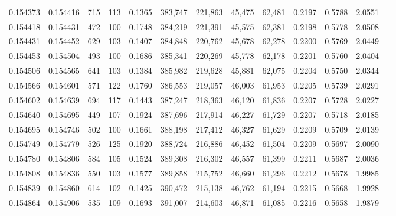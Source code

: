\begin{tabular}{rrrrrrrrrrrrr}
0.154373 & 0.154416 &   715 & 113 &                                     0.1365 & 383,747 & 221,863 &  45,475 &  62,481 & 0.2197 & 0.5788 & 2.0551 \\
0.154418 & 0.154431 &   472 & 100 &                                     0.1748 & 384,219 & 221,391 &  45,575 &  62,381 & 0.2198 & 0.5778 & 2.0508 \\
0.154431 & 0.154452 &   629 & 103 &                                     0.1407 & 384,848 & 220,762 &  45,678 &  62,278 & 0.2200 & 0.5769 & 2.0449 \\
0.154453 & 0.154504 &   493 & 100 &                                     0.1686 & 385,341 & 220,269 &  45,778 &  62,178 & 0.2201 & 0.5760 & 2.0404 \\
0.154506 & 0.154565 &   641 & 103 &                                     0.1384 & 385,982 & 219,628 &  45,881 &  62,075 & 0.2204 & 0.5750 & 2.0344 \\
0.154566 & 0.154601 &   571 & 122 &                                     0.1760 & 386,553 & 219,057 &  46,003 &  61,953 & 0.2205 & 0.5739 & 2.0291 \\
0.154602 & 0.154639 &   694 & 117 &                                     0.1443 & 387,247 & 218,363 &  46,120 &  61,836 & 0.2207 & 0.5728 & 2.0227 \\
0.154640 & 0.154695 &   449 & 107 &                                     0.1924 & 387,696 & 217,914 &  46,227 &  61,729 & 0.2207 & 0.5718 & 2.0185 \\
0.154695 & 0.154746 &   502 & 100 &                                     0.1661 & 388,198 & 217,412 &  46,327 &  61,629 & 0.2209 & 0.5709 & 2.0139 \\
0.154749 & 0.154779 &   526 & 125 &                                     0.1920 & 388,724 & 216,886 &  46,452 &  61,504 & 0.2209 & 0.5697 & 2.0090 \\
0.154780 & 0.154806 &   584 & 105 &                                     0.1524 & 389,308 & 216,302 &  46,557 &  61,399 & 0.2211 & 0.5687 & 2.0036 \\
0.154808 & 0.154836 &   550 & 103 &                                     0.1577 & 389,858 & 215,752 &  46,660 &  61,296 & 0.2212 & 0.5678 & 1.9985 \\
0.154839 & 0.154860 &   614 & 102 &                                     0.1425 & 390,472 & 215,138 &  46,762 &  61,194 & 0.2215 & 0.5668 & 1.9928 \\
0.154864 & 0.154906 &   535 & 109 &                                     0.1693 & 391,007 & 214,603 &  46,871 &  61,085 & 0.2216 & 0.5658 & 1.9879 \\

\end{tabular}
